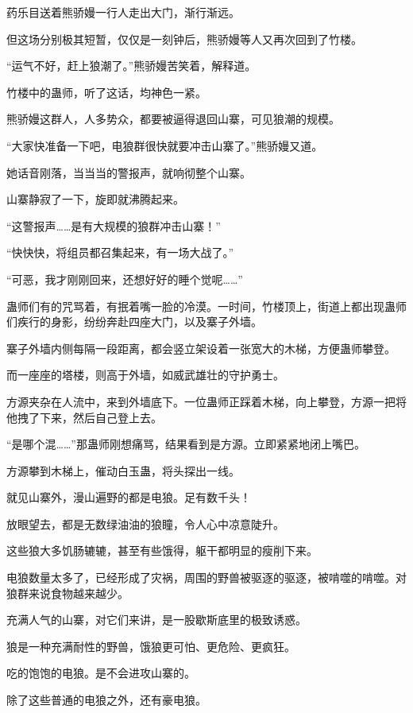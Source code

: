 
\begin{this_body}

药乐目送着熊骄嫚一行人走出大门，渐行渐远。

但这场分别极其短暂，仅仅是一刻钟后，熊骄嫚等人又再次回到了竹楼。

“运气不好，赶上狼潮了。”熊骄嫚苦笑着，解释道。

竹楼中的蛊师，听了这话，均神色一紧。

熊骄嫚这群人，人多势众，都要被逼得退回山寨，可见狼潮的规模。

“大家快准备一下吧，电狼群很快就要冲击山寨了。”熊骄嫚又道。

她话音刚落，当当当的警报声，就响彻整个山寨。

山寨静寂了一下，旋即就沸腾起来。

“这警报声……是有大规模的狼群冲击山寨！”

“快快快，将组员都召集起来，有一场大战了。”

“可恶，我才刚刚回来，还想好好的睡个觉呢……”

蛊师们有的咒骂着，有抿着嘴一脸的冷漠。一时间，竹楼顶上，街道上都出现蛊师们疾行的身影，纷纷奔赴四座大门，以及寨子外墙。

寨子外墙内侧每隔一段距离，都会竖立架设着一张宽大的木梯，方便蛊师攀登。

而一座座的塔楼，则高于外墙，如威武雄壮的守护勇士。

方源夹杂在人流中，来到外墙底下。一位蛊师正踩着木梯，向上攀登，方源一把将他拽了下来，然后自己登上去。

“是哪个混……”那蛊师刚想痛骂，结果看到是方源。立即紧紧地闭上嘴巴。

方源攀到木梯上，催动白玉蛊，将头探出一线。

就见山寨外，漫山遍野的都是电狼。足有数千头！

放眼望去，都是无数绿油油的狼瞳，令人心中凉意陡升。

这些狼大多饥肠辘辘，甚至有些饿得，躯干都明显的瘦削下来。

电狼数量太多了，已经形成了灾祸，周围的野兽被驱逐的驱逐，被啃噬的啃噬。对狼群来说食物越来越少。

充满人气的山寨，对它们来讲，是一股歇斯底里的极致诱惑。

狼是一种充满耐性的野兽，饿狼更可怕、更危险、更疯狂。

吃的饱饱的电狼。是不会进攻山寨的。

除了这些普通的电狼之外，还有豪电狼。


\end{this_body}
